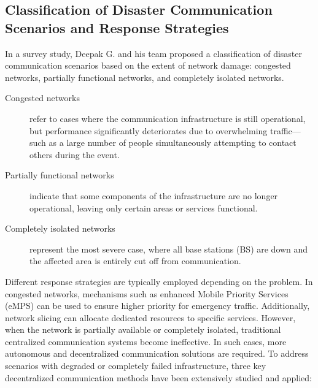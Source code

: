 \subsection{Classification of Disaster Communication Scenarios and Response Strategies}
    In a survey study, Deepak G. and his team proposed a classification of disaster communication scenarios based on the extent of network damage: congested networks, partially functional networks, and completely isolated networks.
    \begin{description}
        \item[Congested networks] refer to cases where the communication infrastructure is still operational, but performance significantly deteriorates due to overwhelming traffic—such as a large number of people simultaneously attempting to contact others during the event.
        \sloppy\item[Partially functional networks] indicate that some components of the infrastructure are no longer operational, leaving only certain areas or services functional.
        \sloppy\item[Completely isolated networks] represent the most severe case, where all base stations (BS) are down and the affected area is entirely cut off from communication.
    \end{description}
    Different response strategies are typically employed depending on the problem. In congested networks, mechanisms such as enhanced Mobile Priority Services (eMPS) can be used to ensure higher priority for emergency traffic. Additionally, network slicing can allocate dedicated resources to specific services. However, when the network is partially available or completely isolated, traditional centralized communication systems become ineffective. In such cases, more autonomous and decentralized communication solutions are required. To address scenarios with degraded or completely failed infrastructure, three key decentralized communication methods have been extensively studied and applied:


